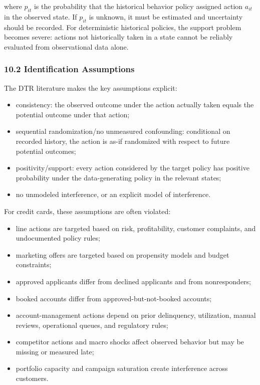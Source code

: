 \documentclass[
]{article}
\providecommand{\tightlist}{%
  \setlength{\itemsep}{0pt}\setlength{\parskip}{0pt}}
\begin{document}
where $p_{it}$ is the probability that the historical behavior
policy assigned action $a_{it}$ in the observed state. If
$p_{it}$ is unknown, it must be estimated and uncertainty should
be recorded. For deterministic historical policies, the support problem
becomes severe: actions not historically taken in a state cannot be
reliably evaluated from observational data alone.

\hypertarget{identification-assumptions}{%
\subsubsection{10.2 Identification
Assumptions}\label{identification-assumptions}}

The DTR literature makes the key assumptions explicit:

\begin{itemize}
\tightlist
\item
  consistency: the observed outcome under the action actually taken
  equals the potential outcome under that action;
\item
  sequential randomization/no unmeasured confounding: conditional on
  recorded history, the action is as-if randomized with respect to
  future potential outcomes;
\item
  positivity/support: every action considered by the target policy has
  positive probability under the data-generating policy in the relevant
  states;
\item
  no unmodeled interference, or an explicit model of interference.
\end{itemize}

For credit cards, these assumptions are often violated:

\begin{itemize}
\tightlist
\item
  line actions are targeted based on risk, profitability, customer
  complaints, and undocumented policy rules;
\item
  marketing offers are targeted based on propensity models and budget
  constraints;
\item
  approved applicants differ from declined applicants and from
  nonresponders;
\item
  booked accounts differ from approved-but-not-booked accounts;
\item
  account-management actions depend on prior delinquency, utilization,
  manual reviews, operational queues, and regulatory rules;
\item
  competitor actions and macro shocks affect observed behavior but may
  be missing or measured late;
\item
  portfolio capacity and campaign saturation create interference across
  customers.
\end{itemize}
\end{document}
